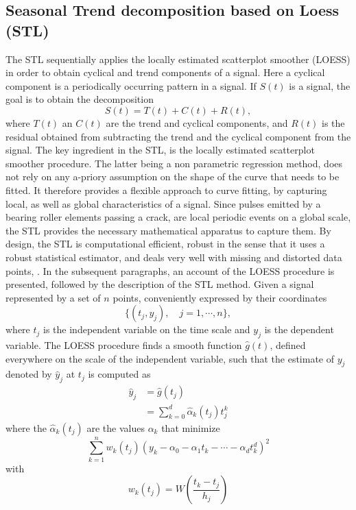 \documentclass[../Main/thesis.tex]{subfiles}
\begin{document}
\subsection{Seasonal Trend decomposition based on Loess (STL)}
The STL sequentially applies the locally estimated scatterplot smoother (LOESS) in order to obtain cyclical and trend components of a signal. Here a cyclical component is a periodically occurring pattern in a signal.
If $S(t)$ is a signal, the goal is to obtain the decomposition 
\begin{equation}
S(t) = T(t) + C(t) + R(t),
\end{equation} 
where $T(t)$ an $C(t)$ are the trend and cyclical components, and $R(t)$ is the residual obtained from subtracting  the trend and the cyclical component from the signal. The key ingredient in the STL, is the locally estimated scatterplot smoother procedure. The latter being a non parametric regression method, does not rely on any a-priory assumption on the shape of the curve that needs to be fitted. It therefore provides a flexible approach to curve fitting, by capturing local, as well as global characteristics of a signal. Since pulses emitted by a bearing roller elements passing a crack, are local periodic events on a global scale, the STL provides the necessary mathematical apparatus to capture them.
\justify
By design, the STL is computational efficient, robust in the sense that it uses a robust statistical estimator, and deals very well with missing and distorted data points, \cite{Cleveland-et-al-1990}. In the subsequent paragraphs, an account of the LOESS procedure is presented, followed by the description of the STL method.
\justify
Given a signal represented by a set of $n$ points, conveniently expressed by their coordinates
\begin{equation}
\{ (t_{j}, y_{j}), \quad j = 1, \cdots, n\},
\end{equation}
where $t_{j}$ is the independent variable on the time scale and $y_{j}$ is the dependent variable. The LOESS procedure finds a smooth function $\hat{g}(t)$, defined everywhere on the scale of the independent variable, such that the estimate of $y_{j}$ denoted by $\hat{y}_{j}$ at $t_{j}$ is computed as 
\begin{equation}
\begin{split}
\hat{y}_{j} &= \hat{g}(t_{j}) \\
                &=\sum_{k=0}^{d}\hat{\alpha}_{k}(t_{j})t_{j}^{k}
\end{split}
\end{equation}
where the $\hat{\alpha}_{k}(t_{j})$ are the values $\alpha_{k}$ that minimize 
\begin{equation}
\sum_{k=1}^{n}w_{k}(t_{j})\left(y_{k}-\alpha_{0}-\alpha_{1}t_{k}-\cdots -\alpha_{d}t_{k}^{d}\right)^{2}
\end{equation}
with 
\begin{equation}
w_{k}(t_{j}) = W\left( \frac{t_{k}-t_{j}}{h_{j}} \right)
\end{equation}
\end{document}
